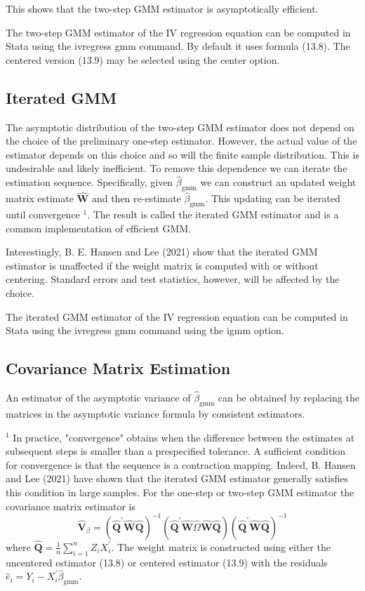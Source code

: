 \documentclass[10pt]{article}
\begin{document}
This shows that the two-step GMM estimator is asymptotically efficient.

The two-step GMM estimator of the IV regression equation can be computed in Stata using the ivregress gmm command. By default it uses formula (13.8). The centered version (13.9) may be selected using the center option.

\subsection{Iterated GMM}
The asymptotic distribution of the two-step GMM estimator does not depend on the choice of the preliminary one-step estimator. However, the actual value of the estimator depends on this choice and so will the finite sample distribution. This is undesirable and likely inefficient. To remove this dependence we can iterate the estimation sequence. Specifically, given $\widehat{\beta}_{\mathrm{gmm}}$ we can construct an updated weight matrix estimate $\widehat{\boldsymbol{W}}$ and then re-estimate $\widehat{\beta}_{\mathrm{gmm}}$. This updating can be iterated until convergence ${ }^{1}$. The result is called the iterated GMM estimator and is a common implementation of efficient GMM.

Interestingly, B. E. Hansen and Lee (2021) show that the iterated GMM estimator is unaffected if the weight matrix is computed with or without centering. Standard errors and test statistics, however, will be affected by the choice.

The iterated GMM estimator of the IV regression equation can be computed in Stata using the ivregress gmm command using the igmm option.

\subsection{Covariance Matrix Estimation}
An estimator of the asymptotic variance of $\widehat{\beta}_{\mathrm{gmm}}$ can be obtained by replacing the matrices in the asymptotic variance formula by consistent estimators.

${ }^{1}$ In practice, "convergence" obtains when the difference between the estimates at subsequent steps is smaller than a prespecified tolerance. A sufficient condition for convergence is that the sequence is a contraction mapping. Indeed, B. Hansen and Lee (2021) have shown that the iterated GMM estimator generally satisfies this condition in large samples. For the one-step or two-step GMM estimator the covariance matrix estimator is
$$
\widehat{\boldsymbol{V}}_{\beta}=\left(\widehat{\boldsymbol{Q}}^{\prime} \widehat{\boldsymbol{W}} \widehat{\boldsymbol{Q}}\right)^{-1}\left(\widehat{\boldsymbol{Q}}^{\prime} \widehat{\boldsymbol{W}} \widehat{\Omega} \widehat{\boldsymbol{W}} \widehat{\boldsymbol{Q}}\right)\left(\widehat{\boldsymbol{Q}}^{\prime} \widehat{\boldsymbol{W}} \widehat{\boldsymbol{Q}}\right)^{-1}
$$
where $\widehat{\boldsymbol{Q}}=\frac{1}{n} \sum_{i=1}^{n} Z_{i} X_{i}^{\prime}$. The weight matrix is constructed using either the uncentered estimator (13.8) or centered estimator (13.9) with the residuals $\widehat{e}_{i}=Y_{i}-X_{i}^{\prime} \widehat{\beta}_{\mathrm{gmm}}$.
\end{document}
